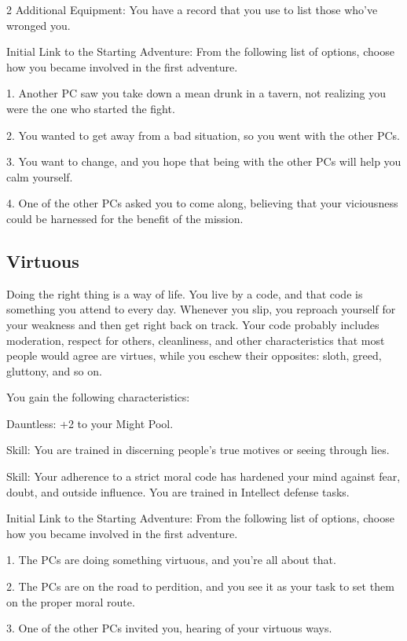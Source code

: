 \begin{multicols}{2}
Additional Equipment: You have a record that you use to list those who’ve wronged you.

Initial Link to the Starting Adventure: From the following list of options, choose how you became involved in the first adventure.

1. Another PC saw you take down a mean drunk in a tavern, not realizing you were the one who started the fight.

2. You wanted to get away from a bad situation, so you went with the other PCs.

3. You want to change, and you hope that being with the other PCs will help you calm yourself.

4. One of the other PCs asked you to come along, believing that your viciousness could be harnessed for the benefit of the mission.

\subsection{Virtuous}

Doing the right thing is a way of life. You live by a code, and that code is something you attend to every day. Whenever you slip, you reproach yourself for your weakness and then get right back on track. Your code probably includes moderation, respect for others, cleanliness, and other characteristics that most people would agree are virtues, while you eschew their opposites: sloth, greed, gluttony, and so on.

You gain the following characteristics:

Dauntless: +2 to your Might Pool.

Skill: You are trained in discerning people’s true motives or seeing through lies.

Skill: Your adherence to a strict moral code has hardened your mind against fear, doubt, and outside influence. You are trained in Intellect defense tasks.

Initial Link to the Starting Adventure: From the following list of options, choose how you became involved in the first adventure.

1. The PCs are doing something virtuous, and you’re all about that.

2. The PCs are on the road to perdition, and you see it as your task to set them on the proper moral route.

3. One of the other PCs invited you, hearing of your virtuous ways.


\end{multicols}
